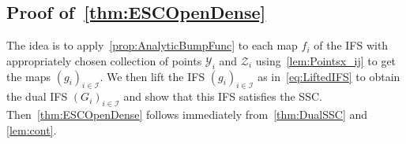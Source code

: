 \documentclass[12pt,]{article}
\def\cref#1{\ref{#1}}%
\theoremstyle{definition}
\theoremstyle{remark}
\newcommand{\0}{\mathbf{0}}
\begin{document}
\begin{comment}
\begin{align*}
I(x)&\leq \delta \cdot \frac{|f'(y_i)|}{|f(y_i)|} \prod_{\substack{y_j\in\mathcal{Y} \\ y_j\neq y_i}} \frac{(x-y_j)^2}{(y_i - y_j)^2}  \prod_{z_j\in\mathcal{Z}} \frac{(x-z_j)^4}{(y_i - z_j)^4} \\
&\stackrel{\eqref{eq:eta1/3Bound}}{\leq}  \delta \cdot \frac{|f'(y_i)|}{|f(y_i)|}\prod_{\substack{y_j\in\mathcal{Y} \\ y_j\neq y_i}}\!\! \Big( 1+\frac{\eta_i^{1/3}}{|y_i-y_j|} \Big)^2 \prod_{z_j\in\mathcal{Z}}\!\! \Big( 1+\frac{\eta_i^{1/3}}{|y_i-z_j|} \Big)^4. 
\end{align*}
We may assume by choosing $\eta_i$ even smaller if necessary that the product of the final two products is at most say 2. Since we also assume that $f([0,1])\subset (0,1)$ and $0<|f'(x)|<1$ for every $x$, we have shown that $I(x)\leq C\cdot\delta+\varepsilon$ for some constant $C>0$ depending only $f$. This completes the bound for $\| \varphi'' \psi A\|_{\infty}$. 

{\color{red} Quick finish: The argument for bounding $\| \varphi \psi A''\|_{\infty}$ and $2\| \varphi' \psi A'\|_{\infty}$ is completely analogous and is omitted. Or we need to add another 1.5-2 pages. If omitted, then we can change condition~\cref{eq:etaOtherBound} slightly.}
\end{proof}
\end{comment}
\subsection{Proof of~\cref{thm:ESCOpenDense}}

The idea is to apply~\cref{prop:AnalyticBumpFunc} to each map $f_i$
of the IFS with appropriately chosen collection of points $\mathcal{Y}_i$ and $\mathcal{Z}_i$
using~\cref{lem:Pointsx_ij} to get the maps $(g_i)_{i\in\mathcal{I}}$. We then lift the IFS
$(g_i)_{i\in\mathcal{I}}$ as in~\cref{eq:LiftedIFS} to obtain the dual IFS $(G_i)_{i\in\mathcal{I}}$ and show that this
IFS satisfies the SSC. Then~\cref{thm:ESCOpenDense} follows immediately from~\cref{thm:DualSSC} and \cref{lem:cont}.
\end{document}
